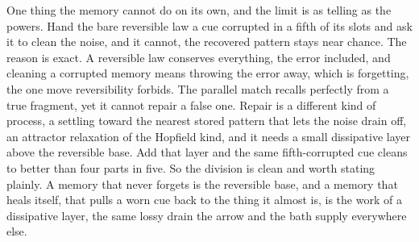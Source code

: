 One thing the memory cannot do on its own, and the limit is as telling as the powers. Hand the bare reversible law a cue corrupted in a fifth of its slots and ask it to clean the noise, and it cannot, the recovered pattern stays near chance. The reason is exact. A reversible law conserves everything, the error included, and cleaning a corrupted memory means throwing the error away, which is forgetting, the one move reversibility forbids. The parallel match recalls perfectly from a true fragment, yet it cannot repair a false one. Repair is a different kind of process, a settling toward the nearest stored pattern that lets the noise drain off, an attractor relaxation of the Hopfield kind, and it needs a small dissipative layer above the reversible base. Add that layer and the same fifth-corrupted cue cleans to better than four parts in five. So the division is clean and worth stating plainly. A memory that never forgets is the reversible base, and a memory that heals itself, that pulls a worn cue back to the thing it almost is, is the work of a dissipative layer, the same lossy drain the arrow and the bath supply everywhere else.
